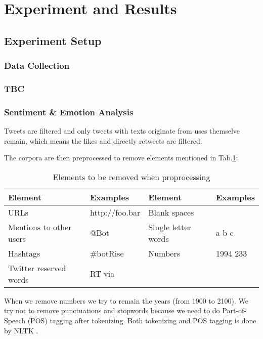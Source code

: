 \section{Experiment and Results}

\subsection{Experiment Setup}

\subsubsection{Data Collection}

\subsubsection{TBC}

\subsubsection{Sentiment \& Emotion Analysis}

Tweets are filtered and only tweets with texts originate from uses themselve remain, which means the likes and directly retweets are filtered.

The corpora are then preprocessed to remove elements mentioned in Tab.\ref{table:elementsRemoved}:

\begin{table}[h]
  \caption{Elements to be removed when proprocessing}
  \label{table:elementsRemoved}
  \centering
  \renewcommand{\tabularxcolumn}{m} %
  \begin{tabularx}{\textwidth}{l  l || l  l}
    \toprule
    \textbf{Element} & \textbf{Examples} & \textbf{Element}    & \textbf{Examples}
    \tabularnewline \midrule
    URLs
                     &
    http://foo.bar   & Blank spaces      &
    \tabularnewline \hline
    Mentions to other users
                     & @Bot              & Single letter words & a b c
    \tabularnewline \hline
    Hashtags
                     & \#botRise         & Numbers             & 1994 233
    \tabularnewline \hline
    Twitter reserved words
                     & RT via            &
                     &
    \tabularnewline \bottomrule
  \end{tabularx}
\end{table}

When we remove numbers we try to remain the years (from 1900 to 2100).
We try not to remove punctuations and stopwords because we need to do Part-of-Speech (POS) tagging after tokenizing. Both tokenizing and POS tagging is done by NLTK \citep{NLTK}.

